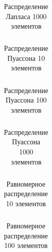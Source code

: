 \documentclass[a4paper]{article}
\begin{document}
        \begin{table}[H]
            \centering
            \begin{tabular}{|c|c|c|c|c|c|}
                \hline
                
            \end{tabular}
            \caption{Распределение Лапласа 1000 элементов}
            \label{tab:laplace_1000}
        \end{table}

        \begin{table}[H]
            \centering
            \begin{tabular}{|c|c|c|c|c|c|}
                \hline
                
            \end{tabular}
            \caption{Распределение Пуассона 10 элементов}
            \label{tab:poisson_10}
        \end{table}

        \begin{table}[H]
            \centering
            \begin{tabular}{|c|c|c|c|c|c|}
                \hline
                
            \end{tabular}
            \caption{Распределение Пуассона 100 элементов}
            \label{tab:poisson_100}
        \end{table}

        \begin{table}[H]
            \centering
            \begin{tabular}{|c|c|c|c|c|c|}
                \hline
                
            \end{tabular}
            \caption{Распределение Пуассона 1000 элементов}
            \label{tab:poisson_1000}
        \end{table}

        \begin{table}[H]
            \centering
            \begin{tabular}{|c|c|c|c|c|c|}
                \hline
                
            \end{tabular}
            \caption{Равномерное распределение 10 элементов}
            \label{tab:uniform_10}
        \end{table}

        \begin{table}[H]
            \centering
            \begin{tabular}{|c|c|c|c|c|c|}
                \hline
                
            \end{tabular}
            \caption{Равномерное распределение 100 элементов}
            \label{tab:uniform_100}
        \end{table}
\end{document}
